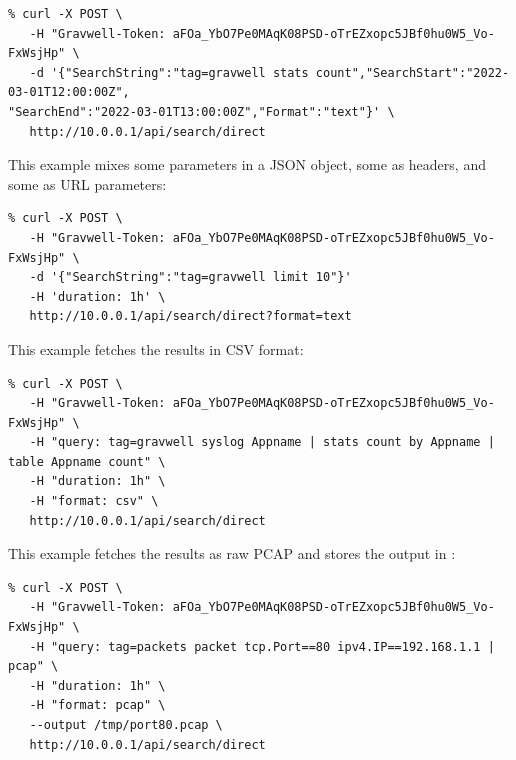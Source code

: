 \begin{verbatim}
% curl -X POST \
   -H "Gravwell-Token: aFOa_YbO7Pe0MAqK08PSD-oTrEZxopc5JBf0hu0W5_Vo-FxWsjHp" \
   -d '{"SearchString":"tag=gravwell stats count","SearchStart":"2022-03-01T12:00:00Z",
"SearchEnd":"2022-03-01T13:00:00Z","Format":"text"}' \
   http://10.0.0.1/api/search/direct
\end{verbatim}

This example mixes some parameters in a JSON object, some as headers, and some as URL parameters:

\begin{verbatim}
% curl -X POST \
   -H "Gravwell-Token: aFOa_YbO7Pe0MAqK08PSD-oTrEZxopc5JBf0hu0W5_Vo-FxWsjHp" \
   -d '{"SearchString":"tag=gravwell limit 10"}'
   -H 'duration: 1h' \
   http://10.0.0.1/api/search/direct?format=text
\end{verbatim}

This example fetches the results in CSV format:

\begin{verbatim}
% curl -X POST \
   -H "Gravwell-Token: aFOa_YbO7Pe0MAqK08PSD-oTrEZxopc5JBf0hu0W5_Vo-FxWsjHp" \
   -H "query: tag=gravwell syslog Appname | stats count by Appname | table Appname count" \
   -H "duration: 1h" \
   -H "format: csv" \
   http://10.0.0.1/api/search/direct
\end{verbatim}

This example fetches the results as raw PCAP and stores the output in :

\begin{verbatim}
% curl -X POST \
   -H "Gravwell-Token: aFOa_YbO7Pe0MAqK08PSD-oTrEZxopc5JBf0hu0W5_Vo-FxWsjHp" \
   -H "query: tag=packets packet tcp.Port==80 ipv4.IP==192.168.1.1 | pcap" \
   -H "duration: 1h" \
   -H "format: pcap" \
   --output /tmp/port80.pcap \
   http://10.0.0.1/api/search/direct
\end{verbatim}
